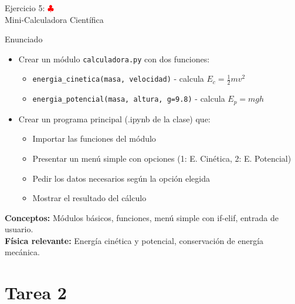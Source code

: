 \documentclass[10pt]{beamer}
\begin{document}
\begin{frame}{Ejercicio 5: \hfill \textcolor{red}{$\clubsuit$} \\ Mini-Calculadora Científica}
  \begin{block}{Enunciado}
    \begin{itemize}
      \item Crear un módulo \texttt{calculadora.py} con dos funciones:
        \begin{itemize}
          \item \texttt{energia\_cinetica(masa, velocidad)} - calcula $E_c = \frac{1}{2}mv^2$
          \item \texttt{energia\_potencial(masa, altura, g=9.8)} - calcula $E_p = mgh$
        \end{itemize}
      \item Crear un programa principal (.ipynb de la clase) que:
        \begin{itemize}
          \item Importar las funciones del módulo
          \item Presentar un menú simple con opciones (1: E. Cinética, 2: E. Potencial)
          \item Pedir los datos necesarios según la opción elegida
          \item Mostrar el resultado del cálculo
        \end{itemize}
    \end{itemize}
  \end{block}
  
  \textbf{Conceptos:} Módulos básicos, funciones, menú simple con if-elif, entrada de usuario.\\
  \textbf{Física relevante:} Energía cinética y potencial, conservación de energía mecánica.
\end{frame}


\section{Tarea 2}
\end{document}
